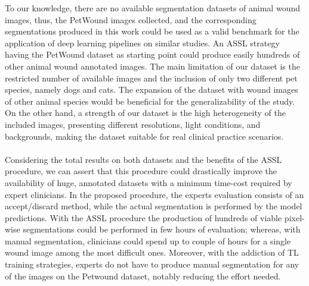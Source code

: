 \documentclass[../main.tex]{subfiles}
\begin{document}
To our knowledge, there are no available segmentation datasets of animal wound images, thus, the PetWound images collected, and the corresponding segmentations produced in this work could be used as a valid benchmark for the application of deep learning pipelines on similar studies. An ASSL strategy having the PetWound dataset as starting point could produce easily hundreds of other animal wound annotated images.
The main limitation of our dataset is the restricted number of available images and the inclusion of only two different pet species, namely dogs and cats. The expansion of the dataset with wound images of other animal species would be beneficial for the generalizability of the study. On the other hand, a strength of our dataset is the high heterogeneity of the included images, presenting different resolutions, light conditions, and backgrounds, making the dataset suitable for real clinical practice scenarios.
\\
\\

Considering the total results on both datasets and the benefits of the ASSL procedure, we can assert that this procedure could drastically improve the availability of huge, annotated datasets with a minimum time-cost required by expert clinicians. 
In the proposed procedure, the experts evaluation consists of an accept/discard method, while the actual segmentation is performed by the model predictions.
With the ASSL procedure the production of hundreds of viable pixel-wise segmentations could be performed in few hours of evaluation; whereas, with manual segmentation, clinicians could spend up to couple of hours for a single wound image among the most difficult ones.
Moreover, with the addiction of TL training strategies, experts do not have to produce manual segmentation for any of the images on the Petwound dataset, notably reducing the effort needed. 
\end{document}

